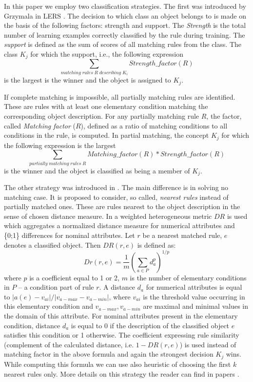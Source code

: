 \documentclass{llncs}
\begin{document}
In this paper we employ two classification strategies. The first was
introduced by Grzymala in LERS \cite{GrzymClass}.  The decision to which
class an object belongs to is made on the basis of the following factors:
strength and support.  The {\it Strength} is the total number of learning
examples correctly classified by the rule during training. The {\it support}
is defined as the sum of scores of all matching rules from the class. The
class $K_j$ for which the support, i.e., the following expression
%
\[ \sum_{matching \; rules \; R \; describing \; K_i} Strength \_
factor(R) \]
%
is the largest is the winner and the object is assigned to $K_j$.

If complete matching is impossible, all partially matching rules are
identified.  These are rules with at least one elementary condition matching
the corresponding object description. For any partially matching rule $R$,
the factor, called {\it Matching factor} ($R$), defined as a ratio of
matching conditions to all conditions in the rule, is computed. In partial
matching, the concept $K_j$ for which the following expression is the
largest
\[ \sum_{ partially \; matching \; rules \; R} %
Matching \_ factor(R) \ast Strength \_ factor(R) \] is the winner and the
object is classified as being a member of $K_j$.

The other strategy was introduced in \cite{stefanowski93}. The main
difference is in solving no matching case. It is proposed to consider,  so
called, {\em nearest rules} instead of partially matched ones. These are
rules nearest to the object description in the sense of chosen distance
measure. In \cite{stefanowski93} a weighted heterogeneous metric $DR$ is
used which aggregates a normalized distance measure for numerical attributes
and \{0;1\} differences for nominal attributes. Let $r$ be a nearest matched
rule, $e$ denotes a classified object. Then $DR(r,e)$ is defined as:
\[
Dr(r,e)= \frac{1}{m}(\sum_{a \in P}d_{a}^{p})^{1/p}
\]
\noindent where $p$ is a coefficient equal to 1 or 2, $m$ is the number of
elementary conditions in $P$ -- a condition part of rule $r$. A distance
$d_a$ for numerical attributes is equal to $|a(e) - v_{ai}|/|v_{a-max}-
v_{a-min}|$, where $v_{ai}$ is the threshold value occurring in this
elementary condition and $v_{a-max}, v_{a-min}$ are maximal and minimal
values in the domain of this attribute. For nominal attributes present in
 the elementary condition, distance $d_a$ is equal to 0 if the description of
the classified object $e$ satisfies this condition or 1 otherwise.
 The coefficient expressing rule similarity (complement of the
calculated distance, i.e. $1 - DR(r,e)$) is used instead of matching factor
in the above formula and again the strongest decision $K_j$ wins. While
computing this formula we can use also heuristic of choosing the first $k$
nearest rules only. More details on this strategy the reader can find in
papers \cite{stefanowski93,stefanowski95,habcia}.
\end{document}
